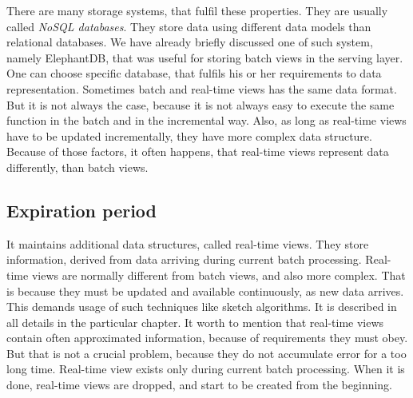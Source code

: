 There are many storage systems, that fulfil these properties.
They are usually called \textit{NoSQL databases}.
They store data using different data models than relational databases.
We have already briefly discussed one of such system, namely ElephantDB, that was useful for storing batch views in the serving layer.
One can choose specific database, that fulfils his or her requirements to data representation.
Sometimes batch and real-time views has the same data format.
But it is not always the case, because it is not always easy to execute the same function in the batch and in the incremental way.
Also, as long as real-time views have to be updated incrementally, they have more complex data structure.
Because of those factors, it often happens, that real-time views represent data differently, than batch views.




\subsection{Expiration period}


It maintains additional data structures, called real-time views.
They store information, derived from data arriving during current batch processing.
Real-time views are normally different from batch views, and also more complex.
That is because they must be updated and available continuously, as new data arrives.
This demands usage of such techniques like sketch algorithms.
It is described in all details in the particular chapter.
It worth to mention that real-time views contain often approximated information, because of requirements they must obey.
But that is not a crucial problem, because they do not accumulate error for a too long time.
Real-time view exists only during current batch processing.
When it is done, real-time views are dropped, and start to be created from the beginning.

